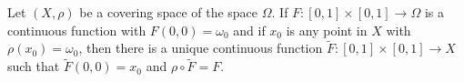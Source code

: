 Let $(X, \rho)$ be a covering space of the space $\Omega$. If $F: [0, 1] \times [0, 1] \rightarrow \Omega$ is a continuous function with $F(0, 0) = \omega_0$ and if $x_0$ is any point in $X$ with $\rho(x_0) = \omega_0$, then there is a unique continuous function $\tilde{F}: [0, 1] \times [0, 1] \rightarrow X$ such that $\tilde{F}(0, 0) = x_0$ and $\rho \circ \tilde{F} = F$.
